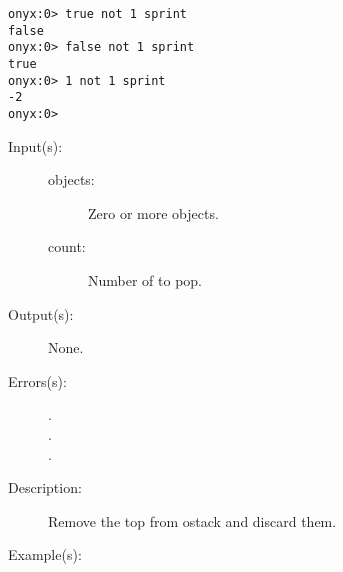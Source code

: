 \begin{description}
\begin{description}
\begin{verbatim}
onyx:0> true not 1 sprint
false
onyx:0> false not 1 sprint
true
onyx:0> 1 not 1 sprint
-2
onyx:0>
		\end{verbatim}
	\end{description}
\label{systemdict:npop}
\item[{\onyxop{objects count}{npop}{--}}: ]
	\begin{description}\item[]
	\item[Input(s): ]
		\begin{description}\item[]
		\item[objects: ]
			Zero or more objects.
		\item[count: ]
			Number of  to pop.
		\end{description}
	\item[Output(s): ] None.
	\item[Errors(s): ]
		\begin{description}\item[]
		\item[.]
		\item[.]
		\item[.]
		\end{description}
	\item[Description: ]
		Remove the top   from ostack and
		discard them.
	\item[Example(s): ]\begin{verbatim}


\end{verbatim}
\end{description}
\end{description}
